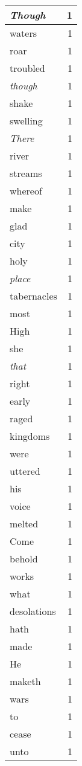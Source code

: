 \begin{center}
\begin{longtable}{l|r}
\emph{Though} & 1 \\ \hline
waters & 1 \\ \hline
roar & 1 \\ \hline
troubled & 1 \\ \hline
\emph{though} & 1 \\ \hline
shake & 1 \\ \hline
swelling & 1 \\ \hline
\emph{There} & 1 \\ \hline
river & 1 \\ \hline
streams & 1 \\ \hline
whereof & 1 \\ \hline
make & 1 \\ \hline
glad & 1 \\ \hline
city & 1 \\ \hline
holy & 1 \\ \hline
\emph{place} & 1 \\ \hline
tabernacles & 1 \\ \hline
most & 1 \\ \hline
High & 1 \\ \hline
she & 1 \\ \hline
\emph{that} & 1 \\ \hline
right & 1 \\ \hline
early & 1 \\ \hline
raged & 1 \\ \hline
kingdoms & 1 \\ \hline
were & 1 \\ \hline
uttered & 1 \\ \hline
his & 1 \\ \hline
voice & 1 \\ \hline
melted & 1 \\ \hline
Come & 1 \\ \hline
behold & 1 \\ \hline
works & 1 \\ \hline
what & 1 \\ \hline
desolations & 1 \\ \hline
hath & 1 \\ \hline
made & 1 \\ \hline
He & 1 \\ \hline
maketh & 1 \\ \hline
wars & 1 \\ \hline
to & 1 \\ \hline
cease & 1 \\ \hline
unto & 1 \\ \hline

\end{longtable}
\end{center}
